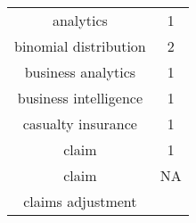 \documentclass[]{book}
\theoremstyle{definition}
\theoremstyle{definition}
\theoremstyle{definition}
\theoremstyle{remark}
\begin{document}
\begin{longtable}[]{@{}cc@{}}
\toprule
\begin{minipage}[t]{0.43\columnwidth}\centering\strut
analytics\strut
\end{minipage} & \begin{minipage}[t]{0.05\columnwidth}\centering\strut
1\strut
\end{minipage}\tabularnewline
\begin{minipage}[t]{0.43\columnwidth}\centering\strut
binomial distribution\strut
\end{minipage} & \begin{minipage}[t]{0.05\columnwidth}\centering\strut
2\strut
\end{minipage}\tabularnewline
\begin{minipage}[t]{0.43\columnwidth}\centering\strut
business analytics\strut
\end{minipage} & \begin{minipage}[t]{0.05\columnwidth}\centering\strut
1\strut
\end{minipage}\tabularnewline
\begin{minipage}[t]{0.43\columnwidth}\centering\strut
business intelligence\strut
\end{minipage} & \begin{minipage}[t]{0.05\columnwidth}\centering\strut
1\strut
\end{minipage}\tabularnewline
\begin{minipage}[t]{0.43\columnwidth}\centering\strut
casualty insurance\strut
\end{minipage} & \begin{minipage}[t]{0.05\columnwidth}\centering\strut
1\strut
\end{minipage}\tabularnewline
\begin{minipage}[t]{0.43\columnwidth}\centering\strut
claim\strut
\end{minipage} & \begin{minipage}[t]{0.05\columnwidth}\centering\strut
1\strut
\end{minipage}\tabularnewline
\begin{minipage}[t]{0.43\columnwidth}\centering\strut
claim\strut
\end{minipage} & \begin{minipage}[t]{0.05\columnwidth}\centering\strut
NA\strut
\end{minipage}\tabularnewline
\begin{minipage}[t]{0.43\columnwidth}\centering\strut
claims adjustment\strut

\end{minipage}
\end{longtable}
\end{document}
